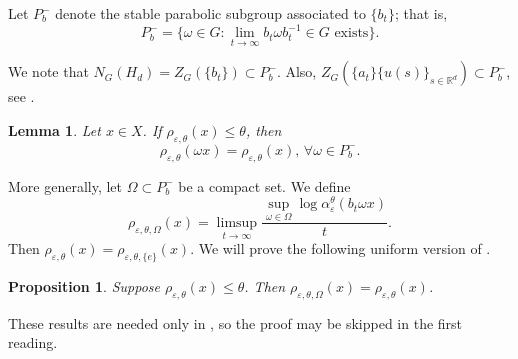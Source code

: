\documentclass[12pt,reqno]{amsart}
\numberwithin{equation}{section}
\theoremstyle{plain}
\newtheorem{prop}[thm]{Proposition}
\newtheorem{lem}[thm]{Lemma}
\theoremstyle{definition}
\theoremstyle{remark}
\newcommand{\R}{\mathbb{R}}
\newcommand{\eps}{\varepsilon}
\begin{document}
Let $P_b^-$ denote the stable parabolic subgroup associated to $\{b_t\}$; that is, 
\begin{equation} \label{eq:Pb-}
P_b^-=\{\omega\in G: \lim_{t\to\infty} b_t\omega b_t^{-1}\in G \text{ exists}\}.
\end{equation}

We note that $N_G(H_d)=Z_G(\{b_t\})\subset P_b^{-}$. Also, $Z_G(\{a_t\}\{u(s)\}_{s\in\R^d})\subset P_b^-$, see . 

\begin{lem} \label{lem:rhoPb-} Let $x\in X$. If $\rho_{\eps,\theta}(x)\leq\theta$, then
\[
\rho_{\eps,\theta}(\omega x)=\rho_{\eps,\theta}(x),\,\forall \omega\in P_b^-.
\]
\end{lem}

More generally, let $\Omega\subset P^-_b$ be a compact set. We define 
\begin{equation} \label{eq:rho-Omega}
\rho_{\eps,\theta,\Omega}(x)=\limsup_{t\to\infty} \frac{\sup_{\omega\in\Omega} \log\alpha^\theta_\eps(b_t\omega x)}{t}.
\end{equation}
Then $\rho_{\eps,\theta}(x)=\rho_{\eps,\theta,\{e\}}(x)$. We will prove the following uniform version of . 

\begin{prop}
    \label{prop:bt-Omega}
    Suppose $\rho_{\eps,\theta}(x)\leq \theta$. Then
    $\rho_{\eps,\theta,\Omega}(x)=\rho_{\eps,\theta}(x)$.
\end{prop}

These results are needed only in , so the proof may be skipped in the first reading.
\end{document}
